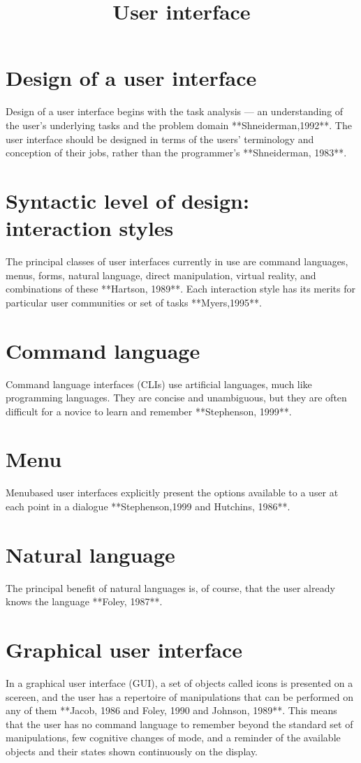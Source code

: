 \documentclass[11pt,english,a4paper]{article}
\title{User interface}
\author{}
\begin{document}
\maketitle{}

\tableofcontents

\section{Design of a user interface}
Design of a user interface begins with the task analysis --- an
understanding of the user's underlying tasks and the problem 
domain **Shneiderman,1992**. The user interface should be 
designed in terms of the users' terminology and conception of 
their jobs, rather than the programmer's **Shneiderman, 1983**.

\section{Syntactic level of design: interaction styles}
The principal classes of user interfaces currently in use are
command languages, menus, forms, natural language, direct manipulation,
virtual reality, and combinations of these **Hartson, 1989**. Each
interaction style has its merits for particular user communities or
set of tasks **Myers,1995**.

\section{Command language}
Command language interfaces (CLIs) use artificial languages, 
much like programming languages. They are concise and unambiguous, 
but they are often difficult for a novice to learn and remember 
**Stephenson, 1999**.

\section{Menu}
Menubased user interfaces explicitly present the options available to
a user at each point in a dialogue **Stephenson,1999 and Hutchins,
1986**. 

\section{Natural language}
The principal benefit of natural languages is, of course, that the
user already knows the language **Foley, 1987**. 

\section{Graphical user interface}
In a graphical user interface (GUI), a set of objects called icons is
presented on a scereen, and the user has a repertoire of manipulations
that can be performed on any of them **Jacob, 1986 and Foley, 1990 and
Johnson, 1989**. This means that the user has no command language to
remember beyond the standard set of manipulations, few cognitive
changes of mode, and a reminder of the available objects and their
states shown continuously on the display.
\end{document}
